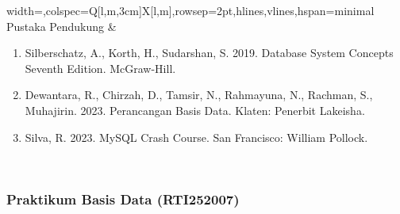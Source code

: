 \begin{longtblr}{width=\textwidth,colspec={Q[l,m,3cm]X[l,m]},rowsep=2pt,hlines,vlines,hspan=minimal}
Pustaka Pendukung & \begin{enumerate}\item Silberschatz, A., Korth, H., Sudarshan, S. 2019. Database System Concepts Seventh Edition. McGraw-Hill.\item Dewantara, R., Chirzah, D., Tamsir, N., Rahmayuna, N., Rachman, S., Muhajirin. 2023. Perancangan Basis Data. Klaten: Penerbit Lakeisha.\item Silva, R. 2023. MySQL Crash Course. San Francisco: William Pollock.\end{enumerate} \\
\end{longtblr}

\subsubsection*{Praktikum Basis Data (RTI252007)}

